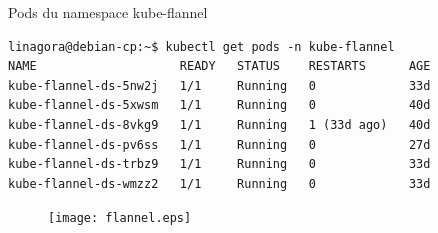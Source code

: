 \begin{frame}[fragile]{Pods du namespace kube-flannel}

\begin{tiny}
\begin{Verbatim}[commandchars=\\\{\}]
linagora@debian-cp:~$ kubectl get pods -n kube-flannel                                                                                                                                        
NAME                    READY   STATUS    RESTARTS      AGE                                                                                                                                   
kube-flannel-ds-5nw2j   1/1     Running   0             33d                                                                                                                                   
kube-flannel-ds-5xwsm   1/1     Running   0             40d                                                                                                                                   
kube-flannel-ds-8vkg9   1/1     Running   1 (33d ago)   40d                                                                                                                                   
kube-flannel-ds-pv6ss   1/1     Running   0             27d                                                                                                                                   
kube-flannel-ds-trbz9   1/1     Running   0             33d                                                                                                                                   
kube-flannel-ds-wmzz2   1/1     Running   0             33d
\end{Verbatim}
\end{tiny}

\begin{figure}
\begin{center}
\texttt{[image: flannel.eps]}
\end{center}
\end{figure}

\end{frame}


